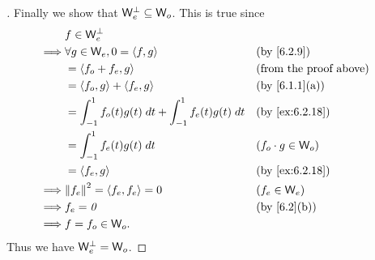\begin{proof}[]
  Finally we show that \(\mathsf{W}_e^{\perp} \subseteq \mathsf{W}_o\).
  This is true since
  \begin{align*}
             & f \in \W_e^{\perp}                                                                                 \\
    \implies & \forall g \in \W_e, 0 = \inn{f, g}                              &  & \text{(by \cref{6.2.9})}      \\
             & = \inn{f_o + f_e, g}                                            &  & \text{(from the proof above)} \\
             & = \inn{f_o, g} + \inn{f_e, g}                                   &  & \text{(by \cref{6.1.1}(a))}   \\
             & = \int_{-1}^1 f_o(t) g(t) \; dt + \int_{-1}^1 f_e(t) g(t) \; dt &  & \text{(by \cref{ex:6.2.18})}  \\
             & = \int_{-1}^1 f_e(t) g(t) \; dt                                 &  & (f_o \cdot g \in \W_o)        \\
             & = \inn{f_e, g}                                                  &  & \text{(by \cref{ex:6.2.18})}  \\
    \implies & \norm{f_e}^2 = \inn{f_e, f_e} = 0                               &  & (f_e \in \W_e)                \\
    \implies & f_e = \zv                                                       &  & \text{(by \cref{6.2}(b))}     \\
    \implies & f = f_o \in \W_o.
  \end{align*}
  Thus we have \(\mathsf{W}_e^{\perp} = \mathsf{W}_o\).
\end{proof}

